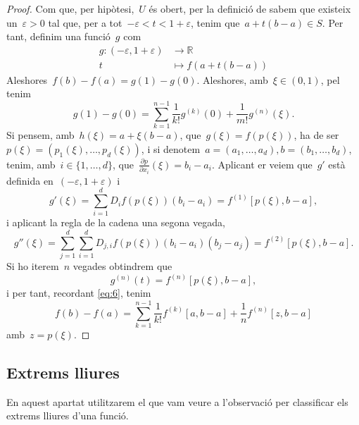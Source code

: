 \documentclass[../../main.tex]{subfiles}
\begin{document}
    \begin{proof}
        Com que, per hipòtesi,~\(U\) és obert, per la definició de  sabem que existeix un~\(\varepsilon>0\) tal que, per a tot~\(-\varepsilon<t<1+\varepsilon\), tenim que~\(a+t(b-a)\in S\).
        Per tant, definim una funció~\(g\) com
        \begin{align*}
        g\colon(-\varepsilon,1+\varepsilon)&\to\mathbb{R}\\
        t&\mapsto f(a+t(b-a))
        \end{align*}
        Aleshores~\(f(b)-f(a)=g(1)-g(0)\).
        Aleshores, amb~\(\xi\in(0,1)\), pel  tenim
        \begin{equation}\label{eq:6}
        g(1)-g(0)=\sum_{k=1}^{n-1}\frac{1}{k!}g^{(k)}(0)+\frac{1}{m!}g^{(n)}(\xi).
        \end{equation}
        Si pensem, amb~\(h(\xi)=a+\xi(b-a)\), que~\(g(\xi)=f(p(\xi))\), ha de ser~\(p(\xi)=(p_{1}(\xi),\dots,p_{d}(\xi))\), i si denotem~\(a=(a_{1},\dots,a_{d}),b=(b_{1},\dots,b_{d})\), tenim, amb~\(i\in\{1,\dots,d\}\), que~\(\frac{\partial p}{\partial x_{i}}(\xi)=b_{i}-a_{i}\).
        Aplicant er  veiem que~\(g'\) està definida en~\((-\varepsilon,1+\varepsilon)\) i
        \[
            g'(\xi)=\sum_{i=1}^{d}D_{i}f(p(\xi))(b_{i}-a_{i})=f^{(1)}[p(\xi),b-a],
        \]
        i aplicant la regla de la cadena una segona vegada,
        \[
            g''(\xi)=\sum_{j=1}^{d}\sum_{i=1}^{d}D_{j,i}f(p(\xi))(b_{i}-a_{i})(b_{j}-a_{j})=f^{(2)}[p(\xi),b-a].
        \]
        Si ho iterem~\(n\) vegades obtindrem que
        \[
            g^{(n)}(t)=f^{(n)}[p(\xi),b-a],
        \]
        i per tant, recordant \eqref{eq:6}, tenim
        \[
            f(b)-f(a)=\sum_{k=1}^{n-1}\frac{1}{k!}f^{(k)}[a,b-a]+\frac{1}{n}f^{(n)}[z,b-a]
        \]
        amb~\(z=p(\xi)\).
    \end{proof}
    \subsection{Extrems lliures}\label{sec:Classificar extrems lliures}
    En aquest apartat utilitzarem el que vam veure a l'observació  per classificar els extrems lliures d'una funció.
\end{document}
